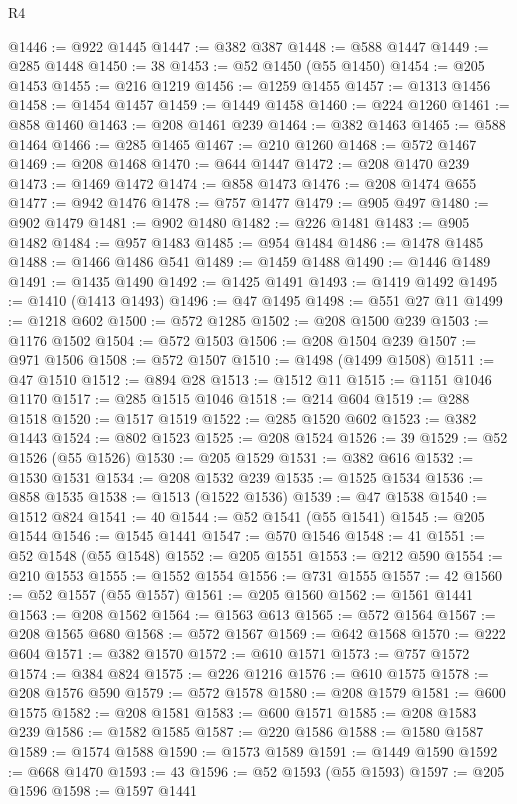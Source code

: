 \begin{lexlean}{R4}
\begin{coremodule}
@1446 := @922 @1445
@1447 := @382 @387
@1448 := @588 @1447
@1449 := @285 @1448
@1450 := 38
@1453 := @52 @1450 (@55 @1450)
@1454 := @205 @1453
@1455 := @216 @1219
@1456 := @1259 @1455
@1457 := @1313 @1456
@1458 := @1454 @1457
@1459 := @1449 @1458
@1460 := @224 @1260
@1461 := @858 @1460
@1463 := @208 @1461 @239
@1464 := @382 @1463
@1465 := @588 @1464
@1466 := @285 @1465
@1467 := @210 @1260
@1468 := @572 @1467
@1469 := @208 @1468
@1470 := @644 @1447
@1472 := @208 @1470 @239
@1473 := @1469 @1472
@1474 := @858 @1473
@1476 := @208 @1474 @655
@1477 := @942 @1476
@1478 := @757 @1477
@1479 := @905 @497
@1480 := @902 @1479
@1481 := @902 @1480
@1482 := @226 @1481
@1483 := @905 @1482
@1484 := @957 @1483
@1485 := @954 @1484
@1486 := @1478 @1485
@1488 := @1466 @1486 @541
@1489 := @1459 @1488
@1490 := @1446 @1489
@1491 := @1435 @1490
@1492 := @1425 @1491
@1493 := @1419 @1492
@1495 := @1410 (@1413 @1493)
@1496 := @47 @1495
@1498 := @551 @27 @11
@1499 := @1218 @602
@1500 := @572 @1285
@1502 := @208 @1500 @239
@1503 := @1176 @1502
@1504 := @572 @1503
@1506 := @208 @1504 @239
@1507 := @971 @1506
@1508 := @572 @1507
@1510 := @1498 (@1499 @1508)
@1511 := @47 @1510
@1512 := @894 @28
@1513 := @1512 @11
@1515 := @1151 @1046 @1170
@1517 := @285 @1515 @1046
@1518 := @214 @604
@1519 := @288 @1518
@1520 := @1517 @1519
@1522 := @285 @1520 @602
@1523 := @382 @1443
@1524 := @802 @1523
@1525 := @208 @1524
@1526 := 39
@1529 := @52 @1526 (@55 @1526)
@1530 := @205 @1529
@1531 := @382 @616
@1532 := @1530 @1531
@1534 := @208 @1532 @239
@1535 := @1525 @1534
@1536 := @858 @1535
@1538 := @1513 (@1522 @1536)
@1539 := @47 @1538
@1540 := @1512 @824
@1541 := 40
@1544 := @52 @1541 (@55 @1541)
@1545 := @205 @1544
@1546 := @1545 @1441
@1547 := @570 @1546
@1548 := 41
@1551 := @52 @1548 (@55 @1548)
@1552 := @205 @1551
@1553 := @212 @590
@1554 := @210 @1553
@1555 := @1552 @1554
@1556 := @731 @1555
@1557 := 42
@1560 := @52 @1557 (@55 @1557)
@1561 := @205 @1560
@1562 := @1561 @1441
@1563 := @208 @1562
@1564 := @1563 @613
@1565 := @572 @1564
@1567 := @208 @1565 @680
@1568 := @572 @1567
@1569 := @642 @1568
@1570 := @222 @604
@1571 := @382 @1570
@1572 := @610 @1571
@1573 := @757 @1572
@1574 := @384 @824
@1575 := @226 @1216
@1576 := @610 @1575
@1578 := @208 @1576 @590
@1579 := @572 @1578
@1580 := @208 @1579
@1581 := @600 @1575
@1582 := @208 @1581
@1583 := @600 @1571
@1585 := @208 @1583 @239
@1586 := @1582 @1585
@1587 := @220 @1586
@1588 := @1580 @1587
@1589 := @1574 @1588
@1590 := @1573 @1589
@1591 := @1449 @1590
@1592 := @668 @1470
@1593 := 43
@1596 := @52 @1593 (@55 @1593)
@1597 := @205 @1596
@1598 := @1597 @1441

\end{coremodule}
\end{lexlean}
